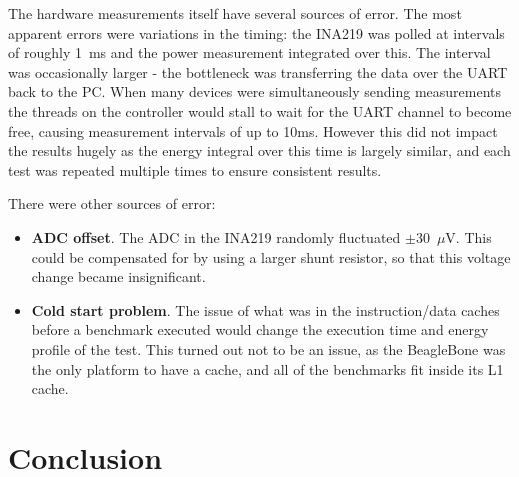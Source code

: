 \documentclass[twocolumn]{article}
\newcommand{\todo}[1]{\textbf{\textcolor{red}{#1}}}
\begin{document}
The hardware measurements itself have several sources of error. The most apparent errors were variations in the timing: the INA219 was polled at intervals of roughly 1~ms and the power measurement integrated over this. The interval was occasionally larger - the bottleneck was transferring the data over the UART back to the PC. When many devices were simultaneously sending measurements the threads on the controller would stall to wait for the UART channel to become free, causing measurement intervals of up to 10ms. However this did not impact the results hugely as the energy integral over this time is largely similar, and each test was repeated multiple times to ensure consistent results.

There were other sources of error:
\begin{itemize}
	\item \textbf{ADC offset}. The ADC in the INA219 randomly fluctuated $\pm$30~$\mu$V. This could be compensated for by using a larger shunt resistor, so that this voltage change became insignificant.
	\item \textbf{Cold start problem}. The issue of what was in the instruction/data caches before a benchmark executed would change the execution time and energy profile of the test. This turned out not to be an issue, as the BeagleBone was the only platform to have a cache, and all of the benchmarks fit inside its L1 cache.
\end{itemize}








\section*{Conclusion}

\end{document}
